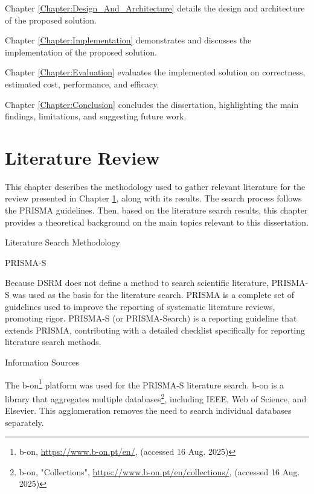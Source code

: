 \documentclass[12pt, reqno]{amsbook}
\makeatletter
\def\section{\@startsection{section}{1}%
      \z@{.5\linespacing\@plus.7\linespacing}{.25\linespacing}%
      {\normalfont\bfseries\flushleft}}
\def\subsection{\@startsection{subsection}{2}%
      \z@{.5\linespacing\@plus.7\linespacing}{.25\linespacing}%
      {\normalfont\bfseries\flushleft}}
\theoremstyle{definition}
\theoremstyle{definition}
\numberwithin{section}{chapter}
\numberwithin{table}{chapter}
\numberwithin{figure}{chapter}
\makeatother
\begin{document}
Chapter \ref{Chapter:Design_And_Architecture} details the design and architecture of the proposed solution.

Chapter \ref{Chapter:Implementation} demonstrates and discusses the implementation of the proposed solution.

Chapter \ref{Chapter:Evaluation} evaluates the implemented solution on correctness, estimated cost, performance, and efficacy.

Chapter \ref{Chapter:Conclusion} concludes the dissertation, highlighting the main findings, limitations, and suggesting future work.

\chapter{Literature Review}
\label{Chapter:Literature_Review}

This chapter describes the methodology used to gather relevant literature for the review presented in Chapter \ref{Chapter:Literature_Review}, along with its results. The search process follows the \ac{PRISMA} guidelines. Then, based on the literature search results, this chapter provides a theoretical background on the main topics relevant to this dissertation.

\section{Literature Search Methodology}

\subsection{PRISMA-S}
\label{Subsection:PRISMA_S}

Because \ac{DSRM} does not define a method to search scientific literature, PRISMA-S was used as the basis for the literature search. \ac{PRISMA} is a complete set of guidelines used to improve the reporting of systematic literature reviews, promoting rigor. PRISMA-S (or PRISMA-Search) is a reporting guideline that extends PRISMA, contributing with a detailed checklist specifically for reporting literature search methods.

\subsection{Information Sources}
\label{Subsection:Information_Sources}

The b-on\footnote{b-on, \url{https://www.b-on.pt/en/}, (accessed 16 Aug. 2025)} platform was used for the PRISMA-S literature search. b-on is a library that aggregates multiple databases\footnote{b-on, "Collections", \url{https://www.b-on.pt/en/collections/}, (accessed 16 Aug. 2025)}, including IEEE, Web of Science, and Elsevier. This agglomeration removes the need to search individual databases separately.
\end{document}
